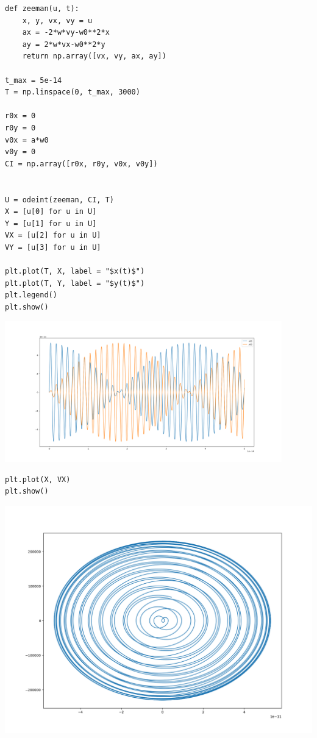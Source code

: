 \begin{Answer}
\begin{lstlisting}
def zeeman(u, t):
    x, y, vx, vy = u
    ax = -2*w*vy-w0**2*x
    ay = 2*w*vx-w0**2*y
    return np.array([vx, vy, ax, ay])

t_max = 5e-14
T = np.linspace(0, t_max, 3000)

r0x = 0
r0y = 0
v0x = a*w0
v0y = 0
CI = np.array([r0x, r0y, v0x, v0y])


U = odeint(zeeman, CI, T)
X = [u[0] for u in U]
Y = [u[1] for u in U]
VX = [u[2] for u in U]
VY = [u[3] for u in U]

plt.plot(T, X, label = "$x(t)$")
plt.plot(T, Y, label = "$y(t)$")
plt.legend()
plt.show()
\end{lstlisting}
\begin{center}
\includegraphics[width=12cm]{TP/Images/ED2_Zeeman1.png}    
\end{center}
\begin{lstlisting}
plt.plot(X, VX)
plt.show()
\end{lstlisting}
\begin{center}
\includegraphics[width=14cm]{TP/Images/ED2_Zeeman2.png}    
\end{center}
\end{Answer}
